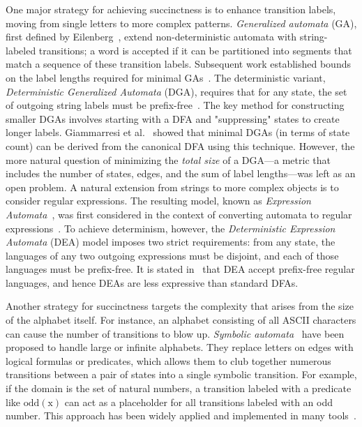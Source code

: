One major strategy for achieving succinctness is to enhance transition labels, moving from single letters to more complex patterns. \emph{Generalized automata} (GA), first defined by Eilenberg~\cite{DBLP:books/lib/Eilenberg74}, extend non-deterministic automata with string-labeled transitions; a word is accepted if it can be partitioned into segments that match a sequence of these transition labels. Subsequent work established bounds on the label lengths required for minimal GAs~\cite{DBLP:conf/icalp/Hashiguchi91}. The deterministic variant, \emph{Deterministic Generalized Automata} (DGA), requires that for any state, the set of outgoing string labels must be prefix-free~\cite{giammarresi1999deterministic}. The key method for constructing smaller DGAs involves starting with a DFA and "suppressing" states to create longer labels. Giammarresi et al.~\cite{giammarresi1999deterministic} showed that minimal DGAs (in terms of state count) can be derived from the canonical DFA using this technique. However, the more natural question of minimizing the \emph{total size} of a DGA—a metric that includes the number of states, edges, and the sum of label lengths—was left as an open problem. A natural extension from strings to more complex objects is to consider regular expressions. The resulting model, known as \emph{Expression Automata}~\cite{DBLP:conf/wia/HanW04}, was first considered in the context of converting automata to regular expressions~\cite{DBLP:journals/tc/BrzozowskiM63}. To achieve determinism, however, the \emph{Deterministic Expression Automata} (DEA) model imposes two strict requirements: from any state, the languages of any two outgoing expressions must be disjoint, and each of those languages must be prefix-free. It is stated in~\cite{DBLP:conf/wia/HanW04} that DEA accept prefix-free regular languages, and hence DEAs are less expressive than standard DFAs. %

Another strategy for succinctness targets the complexity that arises from the size of the alphabet itself. For instance, an alphabet consisting of all ASCII characters can cause the number of transitions to blow up. \emph{Symbolic automata}~\cite{DBLP:conf/popl/VeanesHLMB12, DBLP:conf/cav/DAntoniV17} have been proposed to handle large or infinite alphabets. They replace letters on edges with logical formulas or predicates, which allows them to club together numerous transitions between a pair of states into a single symbolic transition. For example, if the domain is the set of natural numbers, a transition labeled with a predicate like $\operatorname{odd(x)}$ can act as a placeholder for all transitions labeled with an odd number. This approach has been widely applied and implemented in many tools~\cite{loris-page}.

